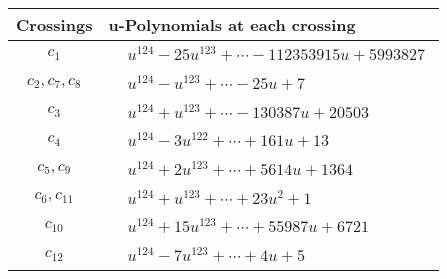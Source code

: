\documentclass[1p]{elsarticle_modified}
\theoremstyle{definition}
\begin{document}
\begin{tabular}{m{50pt}|m{274pt}}
Crossings & \hspace{64pt}u-Polynomials at each crossing \\
\hline $$\begin{aligned}c_{1}\end{aligned}$$&$\begin{aligned}
&u^{124}-25 u^{123}+\cdots-112353915 u+5993827
\end{aligned}$\\
\hline $$\begin{aligned}c_{2},c_{7},c_{8}\end{aligned}$$&$\begin{aligned}
&u^{124}- u^{123}+\cdots-25 u+7
\end{aligned}$\\
\hline $$\begin{aligned}c_{3}\end{aligned}$$&$\begin{aligned}
&u^{124}+u^{123}+\cdots-130387 u+20503
\end{aligned}$\\
\hline $$\begin{aligned}c_{4}\end{aligned}$$&$\begin{aligned}
&u^{124}-3 u^{122}+\cdots+161 u+13
\end{aligned}$\\
\hline $$\begin{aligned}c_{5},c_{9}\end{aligned}$$&$\begin{aligned}
&u^{124}+2 u^{123}+\cdots+5614 u+1364
\end{aligned}$\\
\hline $$\begin{aligned}c_{6},c_{11}\end{aligned}$$&$\begin{aligned}
&u^{124}+u^{123}+\cdots+23 u^2+1
\end{aligned}$\\
\hline $$\begin{aligned}c_{10}\end{aligned}$$&$\begin{aligned}
&u^{124}+15 u^{123}+\cdots+55987 u+6721
\end{aligned}$\\
\hline $$\begin{aligned}c_{12}\end{aligned}$$&$\begin{aligned}
&u^{124}-7 u^{123}+\cdots+4 u+5
\end{aligned}$\\
\hline
\end{tabular}\\~\\
\end{document}
